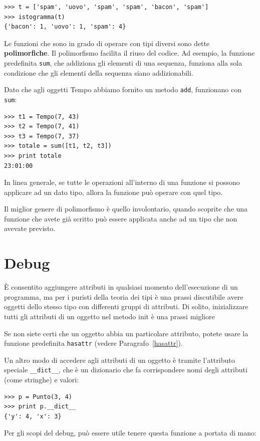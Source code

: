 \documentclass[10pt]{book}
\begin{document}
\begin{verbatim}
>>> t = ['spam', 'uovo', 'spam', 'spam', 'bacon', 'spam']
>>> istogramma(t)
{'bacon': 1, 'uovo': 1, 'spam': 4}
\end{verbatim}
%
Le funzioni che sono in grado di operare con tipi diversi sono dette {\bf polimorfiche}.
Il polimorfismo facilita il riuso del codice.  Ad esempio, la funzione predefinita {\tt sum}, che addiziona gli elementi di una sequenza, funziona alla sola condizione che gli elementi della sequenza siano addizionabili.

Dato che agli oggetti Tempo abbiamo fornito un metodo {\tt add}, funzionano con
{\tt sum}:

\begin{verbatim}
>>> t1 = Tempo(7, 43)
>>> t2 = Tempo(7, 41)
>>> t3 = Tempo(7, 37)
>>> totale = sum([t1, t2, t3])
>>> print totale
23:01:00
\end{verbatim}
%
In linea generale, se tutte le operazioni all'interno di una funzione si possono applicare ad un dato tipo, allora la funzione può operare con quel tipo.

Il miglior genere di polimorfismo è quello involontario, quando scoprite che una funzione che avete già scritto può essere applicata anche ad un tipo che non avevate previsto.


\section{Debug}

È consentito aggiungere attributi in qualsiasi momento dell'esecuzione di un programma, ma per i puristi della teoria dei tipi è una prassi discutibile avere oggetti dello stesso tipo con differenti gruppi di attributi. Di solito, inizializzare tutti gli attributi di un oggetto nel metodo init è una prassi migliore

Se non siete certi che un oggetto abbia un particolare attributo, potete usare la funzione predefinita {\tt hasattr} (vedere Paragrafo~\ref{hasattr}).

Un altro modo di accedere agli attributi di un oggetto è tramite l'attributo speciale \verb"__dict__", che è un dizionario che fa corrispondere nomi degli attributi (come stringhe) e valori:

\begin{verbatim}
>>> p = Punto(3, 4)
>>> print p.__dict__
{'y': 4, 'x': 3}
\end{verbatim}
%
Per gli scopi del debug, può essere utile tenere questa funzione a portata di mano:
\end{document}
